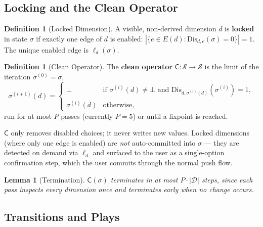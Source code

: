 \documentclass[11pt]{article}
\newtheorem{lemma}[theorem]{Lemma}
\theoremstyle{definition}
\newtheorem{definition}[theorem]{Definition}
\newcommand{\St}{\mathcal{S}}          %
\newcommand{\Dim}{\mathcal{D}}         %
\newcommand{\Edg}[1]{E(#1)}            %
\newcommand{\sel}{\sigma}              %
\newcommand{\clean}{\mathsf{C}}        %
\newcommand{\Dis}{\mathrm{Dis}}        %
\begin{document}
\subsection{Locking and the Clean Operator}\label{sec:clean}

\begin{definition}[Locked Dimension]\label{def:locked}
A visible, non-derived dimension $d$ is \textbf{locked} in state $\sel$
if exactly one edge of $d$ is enabled:
$|\{e \in \Edg{d} : \Dis_{d,e}(\sel)=0\}| = 1$. The unique enabled edge
is $\ell_d(\sel)$.
\end{definition}

\begin{definition}[Clean Operator]\label{def:clean}
The \textbf{clean operator} $\clean : \St \to \St$ is the limit of the
iteration $\sel^{(0)} = \sel$,
\[
  \sel^{(i+1)}(d) =
  \begin{cases}
    \bot
      & \text{if } \sel^{(i)}(d) \neq \bot \text{ and }
        \Dis_{d,\sel^{(i)}(d)}(\sel^{(i)}) = 1,\\
    \sel^{(i)}(d) & \text{otherwise},
  \end{cases}
\]
run for at most $P$ passes (currently $P=5$) or until a fixpoint is
reached.

$\clean$ only removes disabled choices; it never writes new values.
Locked dimensions (where only one edge is enabled) are \emph{not}
auto-committed into $\sel$ — they are detected on demand via $\ell_d$
and surfaced to the user as a single-option confirmation step, which
the user commits through the normal push flow.
\end{definition}

\begin{lemma}[Termination]\label{lem:clean-term}
$\clean(\sel)$ terminates in at most $P \cdot |\Dim|$ steps, since each
pass inspects every dimension once and terminates early when no change
occurs.
\end{lemma}

\subsection{Transitions and Plays}\label{sec:transitions}
\end{document}
